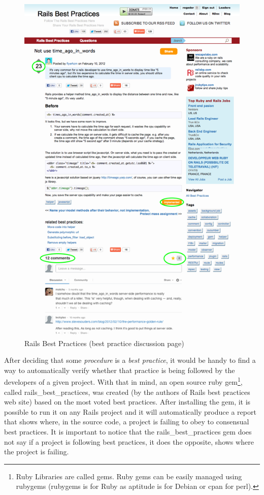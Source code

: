 \begin{figure}[h!]
  \caption{Rails Best Practices (best practice discussion page)}\label{fig:rbp_web}
  \centering
  \includegraphics[scale=0.75]{Images/rbp_web}
\end{figure}


After deciding that some \emph{procedure} is a \emph{best practice},
it would be handy to find a way to automatically verify whether 
that practice is being followed by the developers of a given project.
With that in mind, an open source ruby 
\textsf{gem}\footnote{
  Ruby Libraries are called gems. Ruby gems can be easily managed using rubygems 
  (rubygems is for Ruby as aptitude is for Debian or cpan for perl).
}, 
called rails\_best\_practices, was created (by the authors of Rails best practices web site) 
based on the most voted best practices. 
After installing the gem, it is possible to run it on any Rails project
and it will automatically produce a report that shows where,
in the source code, a project is failing to obey to consensual best practices.
It is important to notice that the rails\_best\_practices gem does not say if a project is following best practices,
it does the opposite, shows where the project is failing.

